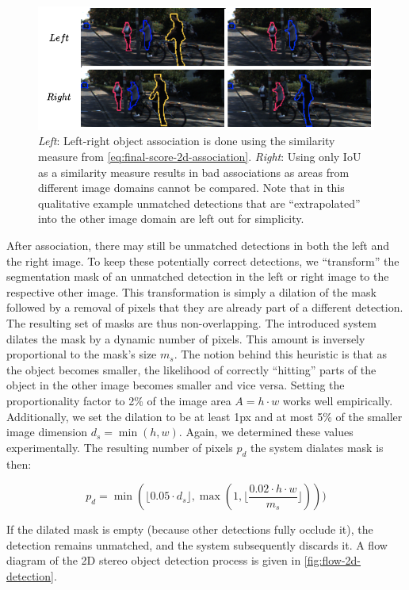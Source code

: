 \documentclass[headsepline, hidelinks, footsepline, footinclude=false, oneside, fontsize=11pt, paper=a4, listof=totoc, bibliography=totoc]{scrbook}
\begin{document}
\begin{figure}[htbp]
\centering
\includegraphics[width=.9\linewidth]{figures/bad-2d-association.pdf}
\caption{\label{fig:bad-2d-association}\emph{Left}: Left-right object association is done using the similarity measure from \cref{eq:final-score-2d-association}. \emph{Right}: Using only IoU as a similarity measure results in bad associations as areas from different image domains cannot be compared. Note that in this qualitative example unmatched detections that are ``extrapolated'' into the other image domain are left out for simplicity.}
\end{figure}

After association, there may still be unmatched detections in both the left and the right image. 
To keep these potentially correct detections, we ``transform'' the segmentation mask of an unmatched detection in the left or right image to the respective other image.
This transformation is simply a dilation of the mask followed by a removal of pixels that they are already part of a different detection.
The resulting set of masks are thus non-overlapping. 
The introduced system dilates the mask by a dynamic number of pixels. This amount is inversely proportional to the mask's size \(m_s\).
The notion behind this heuristic is that as the object becomes smaller, the likelihood of correctly ``hitting'' parts of the object in the other image becomes smaller
and vice versa. Setting the proportionality factor to 2\% of the image area \(A=h \cdot w\) works well empirically. 
Additionally, we set the dilation to be at least 1px and at most 5\% of the smaller image dimension \(d_s=\min(h, w)\). Again, we determined these values experimentally.
The resulting number of pixels \(p_d\) the system dialates mask is then:

\begin{equation}
\label{eq:dilate-px}
p_d = \min(\lfloor 0.05 \cdot d_s \rfloor, \max(1, \lfloor\frac{0.02 \cdot h \cdot w}{m_s}\rfloor)))
\end{equation}

If the dilated mask is empty (because other detections fully occlude it), the detection remains unmatched, and the system subsequently discards it.
A flow diagram of the 2D stereo object detection process is given in \cref{fig:flow-2d-detection}. 
\end{document}
